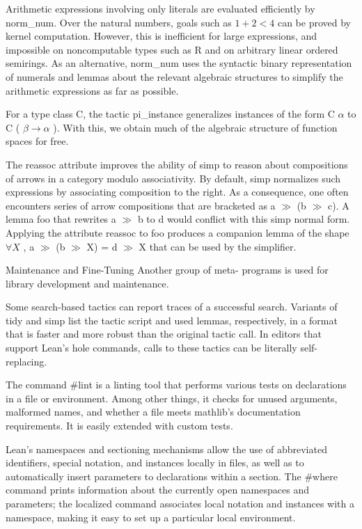 \documentclass[
]{article}
\begin{document}
Arithmetic expressions involving only literals are evaluated efficiently
by norm\_num. Over the natural numbers, goals such as \(1 + 2 < 4\) can
be proved by kernel computation. However, this is inefficient for large
expressions, and impossible on noncomputable types such as R and on
arbitrary linear ordered semirings. As an alternative, norm\_num uses
the syntactic binary representation of numerals and lemmas about the
relevant algebraic structures to simplify the arithmetic expressions as
far as possible.

For a type class C, the tactic pi\_instance generalizes instances of the
form C \(\alpha\) to C ( \(\beta \rightarrow \alpha\) ). With this, we
obtain much of the algebraic structure of function spaces for free.

The reassoc attribute improves the ability of simp to reason about
compositions of arrows in a category modulo associativity. By default,
simp normalizes such expressions by associating composition to the
right. As a consequence, one often encounters series of arrow
compositions that are bracketed as a \(\gg\) (b \(\gg\) c). A lemma foo
that rewrites a \(\gg\) b to d would conflict with this simp normal
form. Applying the attribute reassoc to foo produces a companion lemma
of the shape \(\forall X\) , a \(\gg\) (b \(\gg\) X) = d \(\gg\) X that
can be used by the simplifier.

Maintenance and Fine-Tuning Another group of meta- programs is used for
library development and maintenance.

Some search-based tactics can report traces of a successful search.
Variants of tidy and simp list the tactic script and used lemmas,
respectively, in a format that is faster and more robust than the
original tactic call. In editors that support Lean's hole commands,
calls to these tactics can be literally self-replacing.

The command \#lint is a linting tool that performs various tests on
declarations in a file or environment. Among other things, it checks for
unused arguments, malformed names, and whether a file meets mathlib's
documentation requirements. It is easily extended with custom tests.

Lean's namespaces and sectioning mechanisms allow the use of abbreviated
identifiers, special notation, and instances locally in files, as well
as to automatically insert parameters to declarations within a section.
The \#where command prints information about the currently open
namespaces and parameters; the localized command associates local
notation and instances with a namespace, making it easy to set up a
particular local environment.
\end{document}

